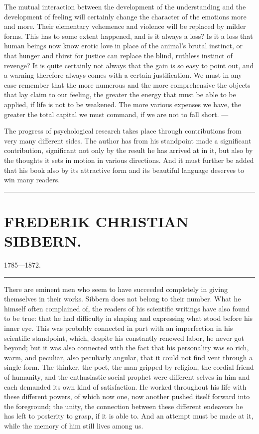 \documentclass[12pt,a4paper,openany]{book}
\newcommand{\opage}[1]{\marginnote{\footnotesize\textit{[#1]}}}
\newcommand{\essay}[2][]{\chapter*{#2}\addcontentsline{toc}{chapter}{#1}}
\newcommand{\streg}{\begin{center}\rule{3em}{0.4pt}\end{center}}
\begin{document}
The mutual interaction between the development of the understanding
and the development of feeling will certainly change
the character of the emotions more and more. Their elementary vehemence and
violence will be replaced by milder forms. This has to some extent
happened, and is it always a loss? Is it a loss that
human beings now know erotic love in place of the animal's brutal instinct,
or that hunger and thirst for justice can replace the
blind, ruthless instinct of revenge? It is quite certainly not
always that the gain is so easy to point out, and a warning
therefore always comes with a certain justification. We must in any
case remember that the more numerous and the more comprehensive the objects
that lay claim to our feeling, the greater the energy that must
be able to be applied, if life is not to be weakened. The
more various expenses we have, the greater the total capital
we must command, if we are not to fall short. ---

The progress of psychological research takes place through contributions
from very many different sides. The author has from his
standpoint made a significant contribution, significant not
only by the result he has arrived at in it, but also
by the thoughts it sets in motion in various directions.
And it must further be added that his book also by its
attractive form and its beautiful language deserves to win
many readers.

\streg{}

\opage{61}
\essay[Frederik Christian Sibbern]{FREDERIK CHRISTIAN SIBBERN.}

\begin{center}1785---1872.\end{center}

\streg{}

There are eminent men who seem to have succeeded completely
in giving themselves in their works. Sibbern does not belong
to their number. What he himself often complained of, the
readers of his scientific writings have also found to be true:
that he had difficulty in shaping and expressing what stood
before his inner eye. This was probably connected in part with
an imperfection in his scientific standpoint, which, despite his
constantly renewed labor, he never got beyond; but it was also
connected with the fact that his personality was so rich, warm,
and peculiar, also peculiarly angular, that it could not find
vent through a single form. The thinker, the poet, the man gripped
by religion, the cordial friend of humanity, and the enthusiastic
social prophet were different selves in him and each demanded its
own kind of satisfaction. He worked throughout his life with these
different powers, of which now one, now another pushed itself
forward into the foreground; the unity, the connection between
these different endeavors he has left to posterity to grasp, if
it is able to. And an attempt must be made at it, while the
memory of him still lives among us.
\end{document}
